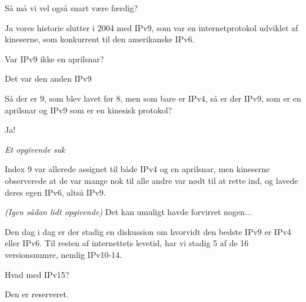 \documentclass[a4paper,11pt]{article}
\begin{document}
\begin{sketch}
 Så må vi vel også snart være færdig?

 Ja vores historie slutter i 2004 med IPv9, som var en internetprotokol udviklet af kineserne, som konkurrent til den amerikanske IPv6.

 Var IPv9 ikke en aprilsnar?

 Det var den anden IPv9 

 Så der er 9, som blev lavet før 8, men som bare er IPv4, så er der IPv9, som er en aprilsnar og IPv9 som er en kinesisk protokol? 

 Ja!

 \textit{Et opgivende suk}

 Index 9 var allerede assignet til både IPv4 og en aprilsnar, men kineserne observerede at de var mange nok til alle andre var nødt til at rette ind, og lavede deres egen IPv6, altså IPv9.

 \textit{(Igen sådan lidt opgivende)} Det kan umuligt havde forvirret nogen...

 Den dag i dag er der stadig en diskussion om hvorvidt den bedste IPv9 er IPv4 eller IPv6. Til resten af internettets levetid, har vi stadig 5 af de 16 versionsnumre, nemlig IPv10-14.

 Hvad med IPv15?

 Den er reserveret.



\end{sketch}
\end{document}

